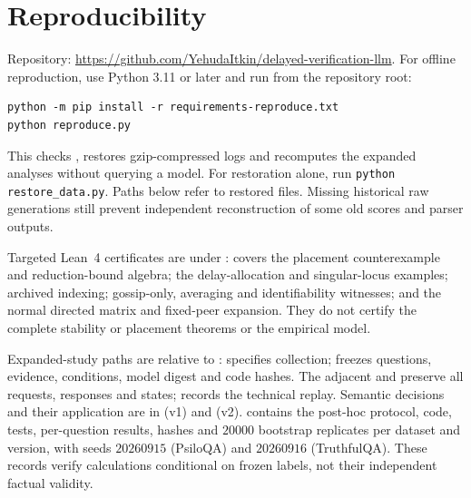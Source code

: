 \documentclass[11pt]{article}
\theoremstyle{definition}
\begin{document}
\section{Reproducibility}\label{app:repro}
Repository: \url{https://github.com/YehudaItkin/delayed-verification-llm}.
For offline reproduction, use Python 3.11 or later and run from the repository root:
\begin{verbatim}
python -m pip install -r requirements-reproduce.txt
python reproduce.py
\end{verbatim}
This checks , restores gzip-compressed logs and recomputes the
expanded analyses without querying a model. For restoration alone, run
\texttt{python restore\_data.py}. Paths below refer to restored files. Missing historical
raw generations still prevent independent reconstruction of some old scores and parser outputs.

Targeted Lean~4 certificates are under :
 covers the placement counterexample and reduction-bound algebra;
 the delay-allocation and singular-locus examples;
 archived indexing;
 gossip-only, averaging and identifiability witnesses; and
 the normal directed matrix and fixed-peer expansion.
They do not certify the complete stability or placement theorems or the empirical model.

Expanded-study paths are relative to :
 specifies collection;
 freezes questions, evidence,
conditions, model digest and code hashes. The adjacent  and
 preserve all requests, responses and states;
 records the technical replay.
Semantic decisions and their application are in 
(v1) and  (v2).
 contains the post-hoc protocol, code, tests, per-question
results, hashes and $20000$ bootstrap replicates per dataset and version, with seeds
$20260915$ (PsiloQA) and $20260916$ (TruthfulQA).
These records verify calculations conditional on frozen labels, not their independent factual validity.
\end{document}
